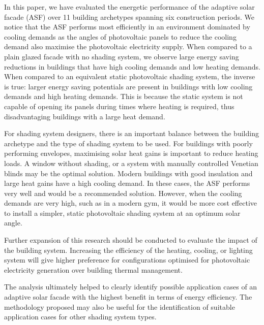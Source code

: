 
In this paper, we have evaluated the energetic performance of the adaptive solar facade (ASF) over 11 building archetypes spanning six construction periods. We notice that the ASF performs most efficiently in an environment dominated by cooling demands as the angles of photovoltaic panels to reduce the cooling demand also maximise the photovoltaic electricity supply. When compared to a plain glazed facade with no shading system, we observe large energy saving reductions in buildings that have high cooling demands and low heating demands. When compared to an equivalent static photovoltaic shading system, the inverse is true: larger energy saving potentials are present in buildings with low cooling demands and high heating demands. This is because the static system is not capable of opening its panels during times where heating is required, thus disadvantaging buildings with a large heat demand. 

For shading system designers, there is an important balance between the building archetype and the type of shading system to be used. For buildings with poorly performing envelopes, maximising solar heat gains is important to reduce heating loads. A window without shading, or a system with manually controlled Venetian blinds may be the optimal solution. Modern buildings with good insulation and large heat gains have a high cooling demand. In these cases, the ASF performs very well and would be a recommended solution. However, when the cooling demands are very high, such as in a modern gym, it would be more cost effective to install a simpler, static photovoltaic shading system at an optimum solar angle. 

Further expansion of this research should be conducted to evaluate the impact of the building system. Increasing the efficiency of the heating, cooling, or lighting system will give higher preference for configurations optimised for photovoltaic electricity generation over building thermal management. 

The analysis ultimately helped to clearly identify possible application cases of an adaptive solar facade with the highest benefit in terms of energy efficiency. The methodology proposed may also be useful for the identification of suitable application cases for other shading system types. 



